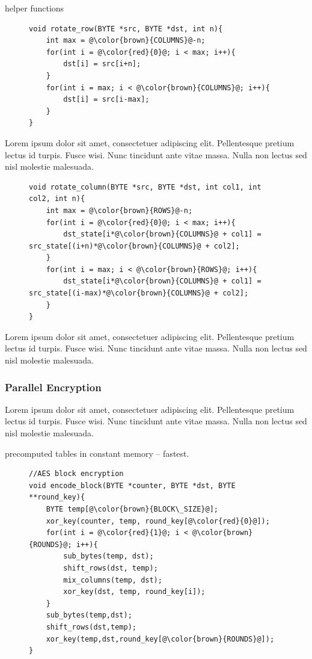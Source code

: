 helper functions
\begin{figure}[H]
\begin{lstlisting}
void rotate_row(BYTE *src, BYTE *dst, int n){
    int max = @\color{brown}{COLUMNS}@-n;
    for(int i = @\color{red}{0}@; i < max; i++){
        dst[i] = src[i+n];    
    }
    for(int i = max; i < @\color{brown}{COLUMNS}@; i++){
        dst[i] = src[i-max];
    }
}
\end{lstlisting}
\end{figure}

Lorem ipsum dolor sit amet, consectetuer adipiscing elit. Pellentesque pretium lectus id turpis. Fusce wisi. Nunc tincidunt ante vitae massa. Nulla non lectus sed nisl molestie malesuada. 

\begin{figure}[H]
\begin{lstlisting}
void rotate_column(BYTE *src, BYTE *dst, int col1, int col2, int n){
    int max = @\color{brown}{ROWS}@-n;
    for(int i = @\color{red}{0}@; i < max; i++){
        dst_state[i*@\color{brown}{COLUMNS}@ + col1] = src_state[(i+n)*@\color{brown}{COLUMNS}@ + col2];
    }
    for(int i = max; i < @\color{brown}{ROWS}@; i++){
        dst_state[i*@\color{brown}{COLUMNS}@ + col1] = src_state[(i-max)*@\color{brown}{COLUMNS}@ + col2];
    }
}
\end{lstlisting}
\end{figure}

Lorem ipsum dolor sit amet, consectetuer adipiscing elit. Pellentesque pretium lectus id turpis. Fusce wisi. Nunc tincidunt ante vitae massa. Nulla non lectus sed nisl molestie malesuada. 
\subsubsection*{Parallel Encryption}
Lorem ipsum dolor sit amet, consectetuer adipiscing elit. Pellentesque pretium lectus id turpis. Fusce wisi. Nunc tincidunt ante vitae massa. Nulla non lectus sed nisl molestie malesuada.

precomputed tables in constant memory -- fastest.


\begin{figure}[H]
\begin{lstlisting}
//AES block encryption
void encode_block(BYTE *counter, BYTE *dst, BYTE **round_key){
    BYTE temp[@\color{brown}{BLOCK\_SIZE}@];
    xor_key(counter, temp, round_key[@\color{red}{0}@]);
    for(int i = @\color{red}{1}@; i < @\color{brown}{ROUNDS}@; i++){
        sub_bytes(temp, dst);
        shift_rows(dst, temp);
        mix_columns(temp, dst);
        xor_key(dst, temp, round_key[i]);
    }
    sub_bytes(temp,dst);
    shift_rows(dst,temp);
    xor_key(temp,dst,round_key[@\color{brown}{ROUNDS}@]);
}
\end{lstlisting}
\end{figure}

